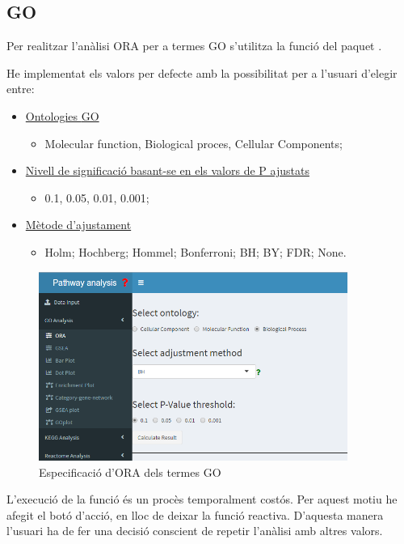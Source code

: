 \subsection{\gls{GO}}

Per realitzar l'anàlisi \gls{ORA} per a termes \gls{GO} s'utilitza la funció  del paquet .

He implementat els valors per defecte amb la possibilitat per a l’usuari d'elegir entre:

\begin{itemize}
\item \underline{Ontologies \gls{GO}} 
\begin{itemize}
\item Molecular function, Biological proces, Cellular Components;
\end{itemize}
\item \underline{Nivell de significació basant-se en els valors de P ajustats}
\begin{itemize}
\item 0.1, 0.05, 0.01, 0.001;
\end{itemize}
\item \underline{Mètode d'ajustament}
\begin{itemize}
\item Holm; Hochberg; Hommel; Bonferroni; BH; BY; FDR; None.
\end{itemize}
\end{itemize}

\begin{figure}[h!]
\includegraphics[width=0.9\textwidth]{figures/App_F5_Items_GO_ORA.png}
\caption{Especificació d'\gls{ORA} dels termes \gls{GO}}
\end{figure}
L'execució de la funció és un procès temporalment costós. Per aquest motiu he afegit el botó d'acció, en lloc de deixar la funció reactiva. D'aquesta manera l'usuari ha de fer una decisió conscient de repetir l'anàlisi amb altres valors.

